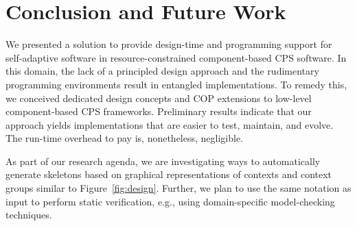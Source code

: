 \section{Conclusion and Future Work}
\label{sec:ending}

We presented a solution to provide design-time and programming support
for self-adaptive software in re\-sour\-ce-constrained component-based
CPS software. In this domain, the lack of a principled design approach
and the rudimentary programming environments result in entangled
implementations. To remedy this, we conceived dedicated design
concepts and COP extensions to low-level component-based CPS
frameworks. Preliminary results indicate that our approach yields
implementations that are easier to test, maintain, and evolve. The
run-time overhead to pay is, nonetheless, negligible.



As part of our research agenda, we are investigating ways to
automatically generate \conesc skeletons based on graphical
representations of contexts and context groups similar to
Figure~\ref{fig:design}. Further, we plan to use the same notation as
input to perform static verification, e.g., using domain-specific
model-checking techniques.

